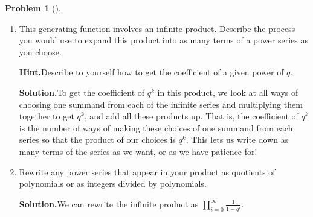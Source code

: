 \documentclass[10pt,]{book}
\theoremstyle{plain}
\theoremstyle{definition}
\newtheorem{activity}[project]{Problem}
\theoremstyle{definition}
\numberwithin{equation}{chapter}
\begin{document}
\begin{activity}[]
\begin{enumerate}[font=\bfseries,label=(\alph*),ref=\alph*]
\item\label{task-140} This generating function involves an infinite product. Describe the process you would use to expand this product into as many terms of a power series as you choose.%
\par\medskip\noindent%
\textbf{Hint.}\quad Describe to yourself how to get the coefficient of a given power of \(q\).%
\par\medskip\noindent%
\textbf{Solution.}\quad To get the coefficient of \(q^k\) in this product, we look at all ways of choosing one summand from each of the infinite series and multiplying them together to get \(q^k\), and add all these products up. That is, the coefficient of \(q^k\) is the number of ways of making these choices of one summand from each series so that the product of our choices is \(q^k\). This lets us write down as many terms of the series as we want, or as we have patience for!%
\item\label{task-141} Rewrite any power series that appear in your product as quotients of polynomials or as integers divided by polynomials.%
\par\medskip\noindent%
\textbf{Solution.}\quad We can rewrite the infinite product as \(\displaystyle\prod_{i=0}^\infty\frac{1}{1-q^i}\).%
\end{enumerate}
\end{activity}
\end{document}
